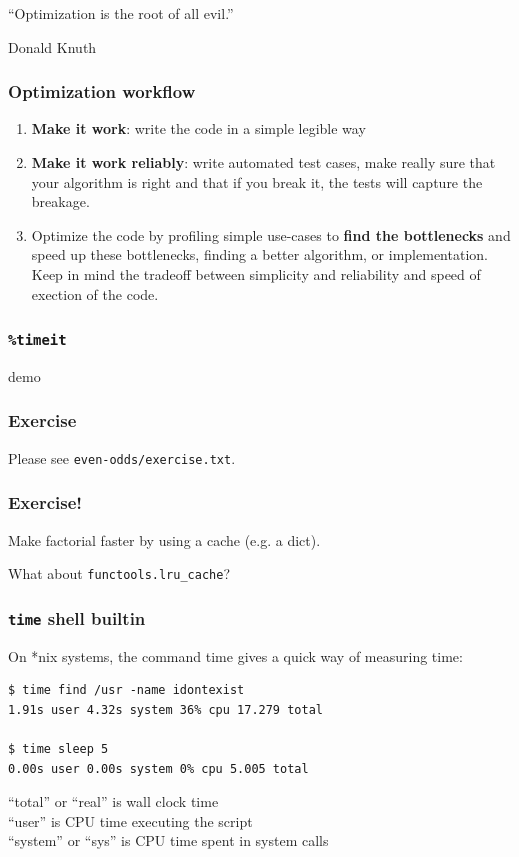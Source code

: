 \documentclass[serif]{beamer}
\begin{document}
\begin{frame}
  ``Optimization is the root of all evil.''

  \hfill Donald Knuth
\end{frame}

\begin{frame}
  \frametitle{Optimization workflow}

  \begin{enumerate}
  \item \textbf{Make it work}: write the code in a simple legible way

  \item \textbf{Make it work reliably}: write automated test cases,
    make really sure that your algorithm is right and that if you
    break it, the tests will capture the breakage.

  \item Optimize the code by profiling simple use-cases to
    \textbf{find the bottlenecks} and speed up these bottlenecks,
    finding a better algorithm, or implementation.
    Keep in mind the tradeoff between simplicity and reliability
    and speed of exection of the code.
  \end{enumerate}
\end{frame}

\begin{frame}
  \frametitle{\texttt{\%timeit}}

  demo
\end{frame}

\begin{frame}
  \frametitle{Exercise}

  Please see \texttt{even-odds/exercise.txt}.

\end{frame}


\begin{frame}
  \frametitle{Exercise!}

  Make factorial faster by using a cache (e.g. a dict).

  What about \texttt{functools.lru\_cache}?
\end{frame}


\begin{frame}[fragile]
  \frametitle{\texttt{time} shell builtin}

  On *nix systems, the command time gives a quick way of measuring time:

  \begin{verbatim}
$ time find /usr -name idontexist
1.91s user 4.32s system 36% cpu 17.279 total
    
$ time sleep 5
0.00s user 0.00s system 0% cpu 5.005 total
  \end{verbatim}

``total'' or ``real'' is wall clock time\\
``user'' is CPU time executing the script\\
``system'' or ``sys'' is CPU time spent in system calls
\end{frame}
\end{document}
